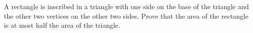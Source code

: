 A rectangle is inscribed in a triangle with one side on the base of the triangle and the other two vertices on the other two sides. Prove that the area of the rectangle is at most half the area of the triangle.
